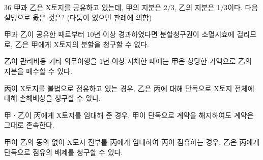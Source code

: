 \begin{question}{36}
甲과 乙은 X토지를 공유하고 있는데, 甲의 지분은 2/3, 乙의 지분은 1/3이다. 다음 설명으로 옳은 것은? (다툼이 있으면 판례에 의함)
\begin{choices}
  \item 甲과 乙이 공유한 때로부터 10년 이상 경과하였다면 분할청구권이 소멸시효에 걸리므로, 乙은 甲에게 X토지의 분할을 청구할 수 없다.
  \item 乙이 관리비용 기타 의무이행을 1년 이상 지체한 때에는 甲은 상당한 가액으로 乙의 지분을 매수할 수 있다.
  \item 丙이 X토지를 불법으로 점유하고 있는 경우, 乙은 丙에 대해 단독으로 X토지 전체에 대해 손해배상을 청구할 수 있다.
  \item 甲ㆍ乙이 丙에게 X토지를 임대해 준 경우, 甲이 단독으로 계약을 해지하여도 계약은 그대로 존속한다.
  \item 甲이 乙의 동의 없이 X토지 전부를 丙에게 임대하여 丙이 점유하는 경우, 乙은 丙에게 단독으로 점유의 배제를 청구할 수 있다.
\end{choices}
\end{question}
